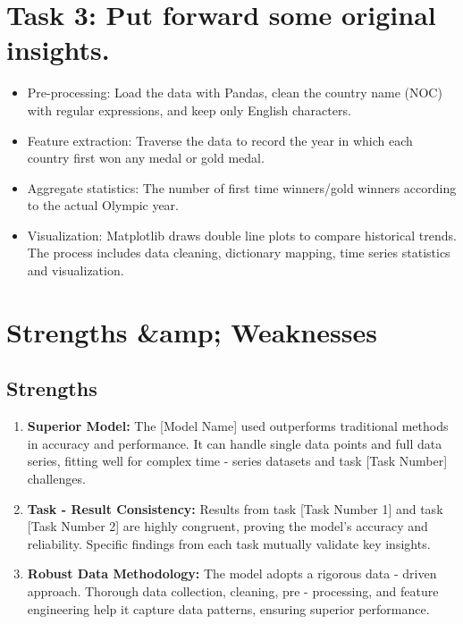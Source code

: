 \documentclass{mcmthesis}
\begin{document}
 \section{Task 3: Put forward some original insights. } 
 \begin{itemize}
  \item Pre-processing: Load the data with Pandas, clean the country name (NOC) with regular expressions, and keep only English characters.
  \item Feature extraction: Traverse the data to record the year in which each country first won any medal or gold medal.
  \item Aggregate statistics: The number of first time winners/gold winners according to the actual Olympic year.
  \item Visualization: Matplotlib draws double line plots to compare historical trends. The process includes data cleaning, dictionary mapping, time series statistics and visualization.
\end{itemize}
\section{Strengths \&amp; Weaknesses} 
\subsection{ Strengths}
\begin{enumerate}
    \item \textbf{Superior Model:} The [Model Name] used outperforms traditional methods in accuracy and performance. It can handle single data points and full data series, fitting well for complex time - series datasets and task [Task Number] challenges.
    \item \textbf{Task - Result Consistency:} Results from task [Task Number 1] and task [Task Number 2] are highly congruent, proving the model's accuracy and reliability. Specific findings from each task mutually validate key insights.
    \item \textbf{Robust Data Methodology:} The model adopts a rigorous data - driven approach. Thorough data collection, cleaning, pre - processing, and feature engineering help it capture data patterns, ensuring superior performance.
\end{enumerate}
\end{document}
